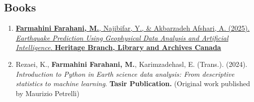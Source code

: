 \documentclass[letterpaper,11pt]{article}
\begin{document}
\begin{justify}
		\subsection*{Books}
		\begin{enumerate}[label=\arabic*.,left=0pt,topsep=7.5pt,partopsep=0pt,itemsep=3.5pt,parsep=0pt]
			\item \href{https://www.amazon.com/dp/106932437X/ref=tmm_pap_swatch_0?_encoding=UTF8&dib_tag=se&dib=eyJ2IjoiMSJ9.fV6NcKzNqVmNMx01e9olJh9RUoGgbt3bwYVVMROKdEU.v8uasEadi-iUYNyBqfXdQtpDWmK8WfYL80Y5MgFWLiI&qid=1748198567&sr=1-2}{\textbf{Farmahini Farahani, M.}, Najibifar, Y., \& Akbarzadeh Afshari, A. (2025). \textit{Earthquake Prediction Using Geophysical Data Analysis and Artificial Intelligence}. \textbf{Heritage Branch, Library and Archives Canada}} 
			\item Rezaei, K., \textbf{Farmahini Farahani, M.}, Karimzadehasl, E. (Trans.). (2024). \textit{Introduction to Python in Earth science data analysis: From descriptive statistics to machine learning}. \textbf{Tasir Publication.} (Original work published by Maurizio Petrelli)
			
		\end{enumerate}
	\end{justify}
	\vspace{-2.4em}
	
\end{document}
